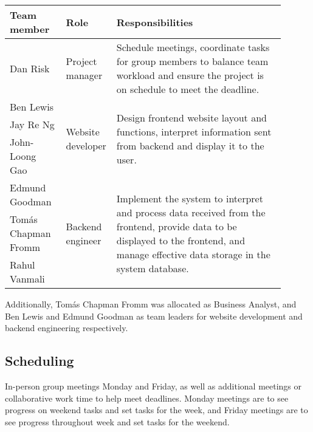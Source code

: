 \documentclass[10pt]{article}
\begin{document}
\begin{table}[H]
\begin{tabular}{p{0.2\linewidth}|p{0.1\linewidth}|p{0.6\linewidth}}
    \hline
    \textbf{Team member} & \textbf{Role}                      & \textbf{Responsibilities} \\ \hline\hline
    Dan Risk             & Project manager                    &
        Schedule meetings, coordinate tasks for group members to balance team
        workload and ensure the project is on schedule to meet the deadline.
    \\ \hline
    Ben Lewis            & \multirow{3}{1\linewidth}{Website developer} & \multirow{3}{1\linewidth}{
        Design frontend website layout and functions, interpret information
        sent from backend and display it to the user.
    } \\
    Jay Re Ng            & \\
    John-Loong Gao       & \\ \hline
    Edmund Goodman       & \multirow{3}{1\linewidth}{Backend engineer} & \multirow{3}{1\linewidth}{
        Implement the system to interpret and process data received from the
        frontend, provide data to be displayed to the frontend, and manage
        effective data storage in the system database.
    } \\
    Tomás Chapman Fromm  & \\
    Rahul Vanmali        & \\
    \hline
\end{tabular}
\end{table}

Additionally, Tomás Chapman Fromm was allocated as Business Analyst, and Ben
Lewis and Edmund Goodman as team leaders for website development and backend
engineering respectively.

\vspace{-4mm}\subsection{Scheduling}\vspace{-2mm}
In-person group meetings Monday and Friday, as well as additional meetings or
collaborative work time to help meet deadlines. Monday meetings are to see
progress on weekend tasks and set tasks for the week, and Friday meetings are to
see progress throughout week and set tasks for the weekend.

\nocite{*}

\vspace{-4mm}
\end{document}
